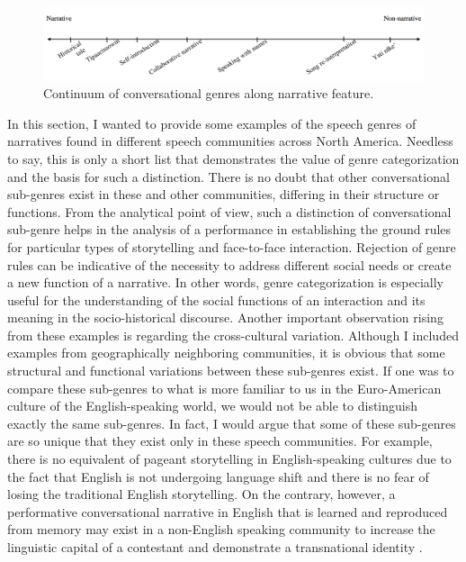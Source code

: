\documentclass[12pt]{article}
\begin{document}
\begin{figure}[ht]
\caption{Continuum of conversational genres along narrative feature.}
\label{continuum}
\includegraphics[width=7in]{continuum.png}
\end{figure}

In this section, I wanted to provide some examples of the speech genres of narratives found in different speech communities across North America. Needless to say, this is only a short list that demonstrates the value of genre categorization and the basis for such a distinction. There is no doubt that other conversational sub-genres exist in these and other communities, differing in their structure or functions. From the analytical point of view, such a distinction of conversational sub-genre helps in the analysis of a performance in establishing the ground rules for particular types of storytelling and face-to-face interaction. Rejection of genre rules can be indicative of the necessity to address different social needs or create a new function of a narrative. In other words, genre categorization is especially useful for the understanding of the social functions of an interaction and its meaning in the socio-historical discourse. Another important observation rising from these examples is regarding the cross-cultural variation. Although I included examples from geographically neighboring communities, it is obvious that some structural and functional variations between these sub-genres exist. If one was to compare these sub-genres to what is more familiar to us in the Euro-American culture of the English-speaking world, we would not be able to distinguish exactly the same sub-genres. In fact, I would argue that some of these sub-genres are so unique that they exist only in these speech communities. For example, there is no equivalent of pageant storytelling in English-speaking cultures due to the fact that English is not undergoing language shift and there is no fear of losing the traditional English storytelling. On the contrary, however, a performative conversational narrative in English that is learned and reproduced from memory may exist in a non-English speaking community to increase the linguistic capital of a contestant and demonstrate a transnational identity \parencite{billings2009}. 
\end{document}
